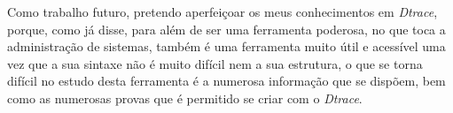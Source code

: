 \documentclass[conference,compsoc]{IEEEtran}
\begin{document}
Como trabalho futuro, pretendo aperfeiçoar os meus conhecimentos em \textit{Dtrace}, porque, como já disse, para além de ser uma ferramenta poderosa, no que toca a administração de sistemas, também é uma ferramenta muito útil e acessível uma vez que a sua sintaxe não é muito difícil nem a sua estrutura, o que se torna difícil no estudo desta ferramenta é a numerosa informação que se dispõem, bem como as numerosas provas que é permitido se criar com o \textit{Dtrace}.
%
%



%
%
\end{document}
